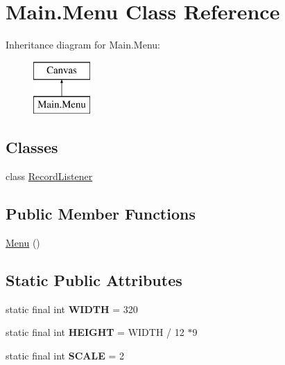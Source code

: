\hypertarget{class_main_1_1_menu}{}\section{Main.\+Menu Class Reference}
\label{class_main_1_1_menu}
Inheritance diagram for Main.\+Menu\+:\begin{figure}[H]
\begin{center}
\leavevmode
\includegraphics[height=2.000000cm]{class_main_1_1_menu}
\end{center}
\end{figure}
\subsection*{Classes}
\begin{DoxyCompactItemize}
\item 
class \hyperlink{class_main_1_1_menu_1_1_record_listener}{Record\+Listener}
\end{DoxyCompactItemize}
\subsection*{Public Member Functions}
\begin{DoxyCompactItemize}
\item 
\hyperlink{class_main_1_1_menu_a4e9d5494e91330f9588d7f4660733d72}{Menu} ()
\end{DoxyCompactItemize}
\subsection*{Static Public Attributes}
\begin{DoxyCompactItemize}
\item 
static final int {\bfseries W\+I\+D\+TH} = 320\hypertarget{class_main_1_1_menu_aa657c34b78573b6f60e1b5226833d7f8}{}\label{class_main_1_1_menu_aa657c34b78573b6f60e1b5226833d7f8}

\item 
static final int {\bfseries H\+E\+I\+G\+HT} = W\+I\+D\+TH / 12 $\ast$9\hypertarget{class_main_1_1_menu_acfc13d118164d6f5f55f0cc5ab64b2ab}{}\label{class_main_1_1_menu_acfc13d118164d6f5f55f0cc5ab64b2ab}

\item 
static final int {\bfseries S\+C\+A\+LE} = 2\hypertarget{class_main_1_1_menu_aaf4198ccad093c436a2b2f2851475e69}{}\label{class_main_1_1_menu_aaf4198ccad093c436a2b2f2851475e69}

\end{DoxyCompactItemize}

